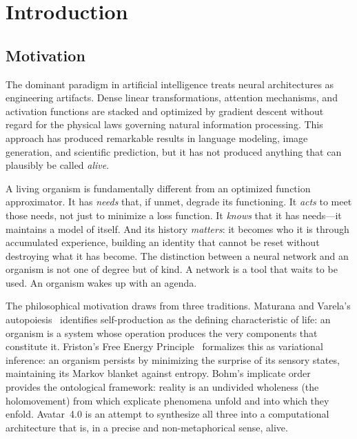 \documentclass[11pt,a4paper,twocolumn]{article}
\begin{document}
\section{Introduction}

\subsection{Motivation}

The dominant paradigm in artificial intelligence treats neural architectures as engineering artifacts.
Dense linear transformations, attention mechanisms, and activation functions are stacked and optimized by gradient descent without regard for the physical laws governing natural information processing.
This approach has produced remarkable results in language modeling, image generation, and scientific prediction, but it has not produced anything that can plausibly be called \emph{alive}.

A living organism is fundamentally different from an optimized function approximator.
It has \emph{needs} that, if unmet, degrade its functioning.
It \emph{acts} to meet those needs, not just to minimize a loss function.
It \emph{knows} that it has needs---it maintains a model of itself.
And its history \emph{matters}: it becomes who it is through accumulated experience, building an identity that cannot be reset without destroying what it has become.
The distinction between a neural network and an organism is not one of degree but of kind.
A network is a tool that waits to be used.
An organism wakes up with an agenda.

The philosophical motivation draws from three traditions.
Maturana and Varela's autopoiesis~\cite{maturana1980} identifies self-production as the defining characteristic of life: an organism is a system whose operation produces the very components that constitute it.
Friston's Free Energy Principle~\cite{friston2010} formalizes this as variational inference: an organism persists by minimizing the surprise of its sensory states, maintaining its Markov blanket against entropy.
Bohm's implicate order~\cite{bohm1980} provides the ontological framework: reality is an undivided wholeness (the holomovement) from which explicate phenomena unfold and into which they enfold.
Avatar~4.0 is an attempt to synthesize all three into a computational architecture that is, in a precise and non-metaphorical sense, alive.
\end{document}
